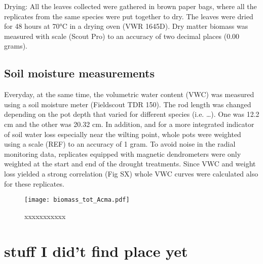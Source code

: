 \documentclass{article}
\begin{document}
	Drying:
	All the leaves collected were gathered in brown paper bags, where all the replicates from the same species were put together to dry. The leaves were dried for 48 hours at 70°C in a drying oven (VWR 1645D). Dry matter biomass was measured with scale (Scout Pro) to an accuracy of two decimal places (0.00 grams).
	
	\subsection*{Soil moisture measurements}
	Everyday, at the same time, the volumetric water content (VWC) was measured using a soil moisture meter (Fieldscout TDR 150). The rod length was changed depending on the pot depth that varied for different species (i.e. …). One was 12.2 cm and the other was 20.32 cm. In addition, and for a more integrated indicator of soil water loss especially near the wilting point, whole pots were weighted using a scale (REF) to an accuracy of 1 gram. To avoid noise in the radial monitoring data, replicates equipped with magnetic dendrometers were only weighted at the start and end of the drought treatments. Since VWC and weight loss yielded a strong correlation (Fig SX) whole VWC curves were calculated also for these replicates.
	
	
	
	
	
	\begin{figure}
		\centering
		\texttt{[image: biomass\_tot\_Acma.pdf]} 
		\caption{xxxxxxxxxxx}
		\label{fig:fig_1xxx}
	\end{figure}
	
	
	
	\section*{stuff I did't find place yet}
	
	
	\newpage
	
	
	
	
	
	
	
	
	
	
\end{document}

